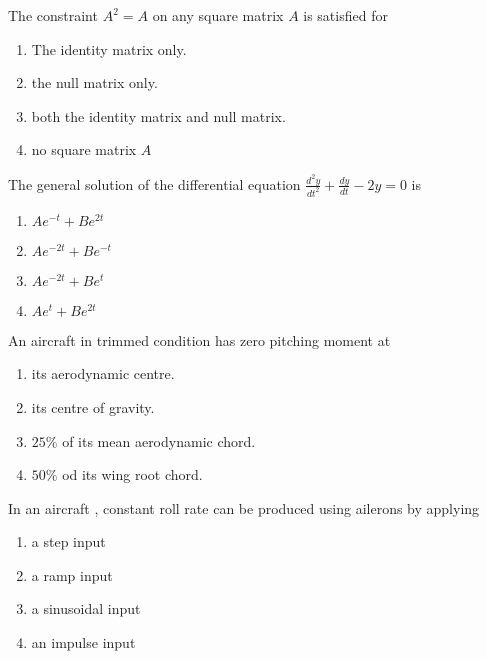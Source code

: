  \iffalse
\chapter{2012}
\author{EE24BTECH11021 - Eshan Ray}
\section{ae}
\fi
    \item The constraint $A^2=A$ on any square matrix $A$ is satisfied for
    \begin{enumerate}
        \item The identity matrix only.
        \item the null matrix only.
        \item both the identity matrix and null matrix.
        \item no square matrix $A$
    \end{enumerate}
    \item The general solution of the differential equation $\frac{d^2y}{dt^2}+\frac{dy}{dt}-2y=0$ is  
    \begin{enumerate}
        \item $Ae^{-t}+Be^{2t}$
        \item $Ae^{-2t}+Be^{-t}$
        \item $Ae^{-2t}+Be^{t}$
        \item $Ae^{t}+Be^{2t}$
    \end{enumerate}
    \item An aircraft in trimmed condition has zero pitching moment at 
    \begin{enumerate}
        \item its aerodynamic centre.
        \item its centre of gravity.
        \item $25\%$ of its mean aerodynamic chord.
        \item $50\%$ od its wing root chord.
    \end{enumerate}
    \item In an aircraft , constant roll rate can be produced using ailerons by applying
    \begin{enumerate}
        \item a step input
        \item a ramp input
        \item a sinusoidal input
        \item an impulse input
    \end{enumerate}
